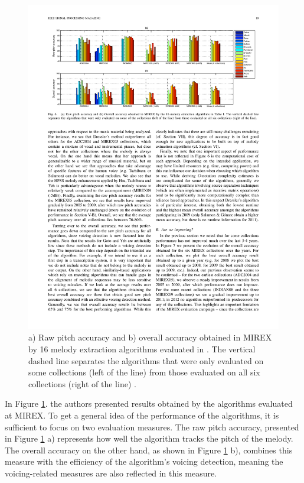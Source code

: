 \begin{figure}[h!]
  \centering
    \includegraphics[width=\textwidth]{Figures/comparisonall}
      \caption{a) Raw pitch accuracy and b) overall accuracy obtained in MIREX by 16 melody extraction algorithms evaluated in \cite{comparison}. The vertical dashed line separates the algorithms that were only evaluated on some collections (left of the line) from those evaluated on all six collections (right of the line) \cite{comparison}.}
\label{fig:comparison}
\end{figure}


In Figure \ref{fig:comparison}. the authors presented results obtained by the algorithms evaluated at MIREX. To get a general idea of the performance of the algorithms, it is sufficient to focus on two evaluation measures.
The raw pitch accuracy, presented in Figure \ref{fig:comparison} a) represents how well the algorithm tracks the pitch of the melody. The overall accuracy on the other hand, as shown in Figure \ref{fig:comparison} b), combines this measure with the efficiency of the algorithm's voicing detection, meaning the voicing-related measures are also reflected in this measure.

